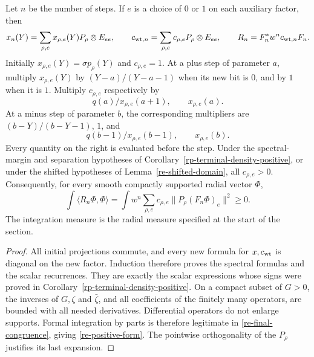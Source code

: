 \begin{corollary}\label{re-density}
Let \(n\) be the number of steps.  If \(e\) is a choice
of \(0\) or \(1\) on each auxiliary factor, then
\begin{equation}
 x_n(Y)=\sum_{\rho,e}x_{\rho,e}(Y)P_\rho\otimes E_{ee},
 \qquad
 c_{{\rm wt},n}=\sum_{\rho,e}c_{\rho,e}P_\rho\otimes E_{ee},
 \qquad
 R_n=F_n^*w^n c_{{\rm wt},n}F_n .              \label{re-final-congruence}
\end{equation}
Initially \(x_{\rho,e}(Y)=\sigma p_\rho(Y)\) and
\(c_{\rho,e}=1\).
At a plus step of parameter \(a\), multiply
\(x_{\rho,e}(Y)\) by
\((Y-a)/(Y-a-1)\) when its new bit is \(0\), and by \(1\)
when it is \(1\).  Multiply \(c_{\rho,e}\) respectively by
\begin{equation}
                  q(a)/x_{\rho,e}(a+1),\qquad x_{\rho,e}(a).
                                                               \label{re-plus-scalar}
\end{equation}
At a minus step of parameter \(b\), the corresponding
multipliers are \((b-Y)/(b-Y-1)\), \(1\), and
\begin{equation}
                  q(b-1)/x_{\rho,e}(b-1),\qquad x_{\rho,e}(b).
                                                               \label{re-minus-scalar}
\end{equation}
Every quantity on the right is evaluated before the step.
Under the spectral-margin and separation hypotheses of
Corollary~\ref{rp-terminal-density-positive}, or under
the shifted hypotheses of Lemma~\ref{re-shifted-domain}, all
\(c_{\rho,e}>0\).
Consequently, for every smooth compactly supported radial
vector \(\Phi\),
\begin{equation}
 \int\langle R_n\Phi,\Phi\rangle
       =\int w^n\sum_{\rho,e}c_{\rho,e}
                       \|P_\rho(F_n\Phi)_e\|^2\geq0.             \label{re-positive-form}
\end{equation}
The integration measure is the radial measure specified at
the start of the section.
\end{corollary}

\begin{proof}
All initial projections commute, and every new formula for
\(x,c_{\rm wt}\) is diagonal on the new factor.
Induction therefore proves the spectral formulas and the
scalar recurrences.  They are exactly the scalar expressions
whose signs were proved in
Corollary~\ref{rp-terminal-density-positive}.
On a compact subset of \(G>0\), the inverses of \(G,\zeta\)
and \(\bar\zeta\), and all coefficients of the finitely many
operators, are bounded with all needed derivatives.
Differential operators do not enlarge supports.
Formal integration by parts is therefore legitimate in
\eqref{re-final-congruence}, giving
\eqref{re-positive-form}.  The pointwise orthogonality of
the \(P_\rho\) justifies its last expansion.
\end{proof}

